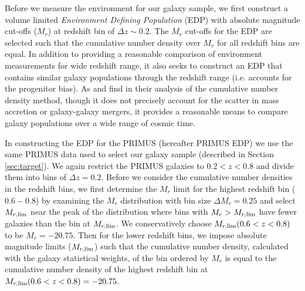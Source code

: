 \documentclass{emulateapj}
\begin{document}
Before we measure the environment for our galaxy sample, we first construct a volume limited {\em Environment Defining Population} (EDP) with absolute magnitude cut-offs ($M_{r}$) at redshift bin of $\Delta z \sim 0.2$. The $M_{r}$ cut-offs for the EDP are selected such that the cumulative number density over $M_{r}$ for all redshift bins are equal. In addition to providing a reasonable comparison of environment measurements for wide redshift range, it also seeks to construct an EDP that contains similar galaxy populations through the redshift range (i.e. accounts for the progenitor bias). As \cite{Behroozi:2013aa} and \cite{Leja:2013aa} find in their analysis of the cumulative number density method, though it does not precisely account for the scatter in mass accretion or galaxy-galaxy mergers, it provides a reasonable means to compare galaxy populations over a wide range of cosmic time. 

In constructing the EDP for the PRIMUS (hereafter PRIMUS EDP) we use the same PRIMUS data used to select our galaxy sample (described in Section \ref{sec:target}). We again restrict the PRIMUS galaxies to $0.2 < z < 0.8$ and divide them into bins of $\Delta z = 0.2$. Before we consider the cumulative number densities in the redshift bins, we first determine the $M_r$ limit for the highest redshift bin ($0.6-0.8$) by examining the $M_{r}$ distribution with bin size $\Delta M_{r} = 0.25$ and select $M_{r,\rm{lim}}$ near the peak of the distribution where bins with $M_{r} > M_{r,\rm{lim}}$ have fewer galaxies than the bin at $M_{r, \rm{lim}}$. We conservatively choose $M_{r, \rm{lim}}(0.6 < z < 0.8)$ to be $M_{r} = -20.75$. Then for the lower redshift bins, we impose absolute magnitude limits ($M_{r,\rm{lim}}$) such that the cumulative number density, calculated with the galaxy statistical weights, of the bin ordered by $M_{r}$ is equal to the cumulative number density of the highest redshift bin at $M_{r, \rm{lim}}(0.6 < z < 0.8) = -20.75$. 
\end{document}
